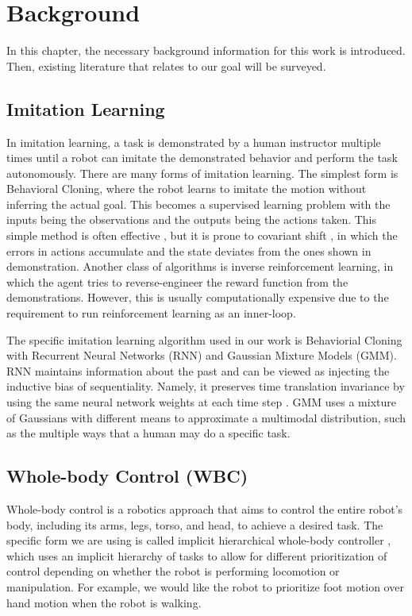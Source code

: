 \chapter{Background}

In this chapter, the necessary background information for this work is introduced. Then, existing literature that relates to our goal will be surveyed.

\section{Imitation Learning}

In imitation learning, a task is demonstrated by a human instructor multiple times until a robot can imitate the demonstrated behavior and perform the task autonomously. 
There are many forms of imitation learning.
The simplest form is Behavioral Cloning, where the robot learns to imitate the motion without inferring the actual goal. This becomes a supervised learning problem with the inputs being the observations and the outputs being the actions taken. This simple method is often effective \cite{zhang2018deep}, but it is prone to covariant shift \cite{ross2011reduction}, in which the errors in actions accumulate and the state deviates from the ones shown in demonstration. 
Another class of algorithms is inverse reinforcement learning, in which the agent tries to reverse-engineer the reward function from the demonstrations. 
However, this is usually computationally expensive due to the requirement to run reinforcement learning as an inner-loop.

The specific imitation learning algorithm used in our work is Behaviorial Cloning with Recurrent Neural Networks (RNN) and Gaussian Mixture Models (GMM). RNN maintains information about the past and can be viewed as injecting the inductive bias of sequentiality. Namely, it preserves time translation invariance by using the same neural network weights at each time step \cite{battaglia2018relational}. GMM uses a mixture of Gaussians with different means to approximate a multimodal distribution, such as the multiple ways that a human may do a specific task.

\section{Whole-body Control (WBC)}

Whole-body control is a robotics approach that aims to control the entire robot's body, including its arms, legs, torso, and head, to achieve a desired task.
The specific form we are using is called implicit hierarchical whole-body controller \cite{Ahn2021VersatileLP}, which uses an implicit hierarchy of tasks to allow for different prioritization of control depending on whether the robot is performing locomotion or manipulation. For example, we would like the robot to prioritize foot motion over hand motion when the robot is walking.

